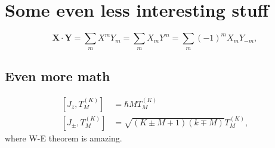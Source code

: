\chapter{Some even less interesting stuff}
\label{app:Appendix}

\lipsum[1-2]

\begin{equation}
	\mathbf{X}\cdot\mathbf{Y} = \sum\limits_{m}X^mY_m= \sum\limits_{m}X_mY^m=\sum\limits_{m}\left(-1\right)^mX_mY_{-m},%
	\label{eq:scalar_prod_sph}
\end{equation}


\section{Even more math}
\lipsum[1-2]

\begin{align}
	\left[J_z,T^{\left(K\right)}_M\right] &= \hbar M T^{\left(K\right)}_M\nonumber\\
	\left[J_{\pm},T^{\left(K\right)}_M\right] &= \sqrt{\left(K\pm M+1\right)\left(k\mp M\right)}T^{\left(K\right)}_M,
\end{align}
where W-E theorem is amazing.
